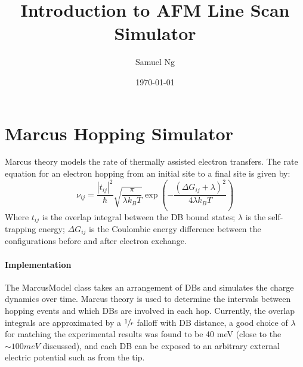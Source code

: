 \documentclass{article}
\title{Introduction to AFM Line Scan Simulator}
\date{\today}
\author{Samuel Ng}
\begin{document}
\makeatletter
\begin{center}
  \Large
  \textbf{\@title}
  \par
  \@author
\end{center}
\makeatother


\section{Marcus Hopping Simulator} \label{sec:introduction}




Marcus theory models the rate of thermally assisted electron transfers. The rate equation for an electron hopping from an initial site to a final site is given by:
%
\begin{equation}
  \nu_{ij} = \frac{|t_{ij}|^{2}}{\hbar} \sqrt{\frac{\pi}{\lambda k_{B} T}} \exp \left(- \frac{(\Delta G_{ij} + \lambda)^{2}}{4 \lambda k_{B} T} \right)
  \label{eq:marcus-tunneling-rate}
\end{equation}
%
Where $t_{ij}$ is the overlap integral between the DB bound states; $\lambda$ is the self-trapping energy; $\Delta G_{ij}$ is the Coulombic energy difference between the configurations before and after electron exchange.




\paragraph{Implementation}

The MarcusModel class takes an arrangement of DBs and simulates the charge dynamics over time. Marcus theory is used to determine the intervals between hopping events and which DBs are involved in each hop. Currently, the overlap integrals are approximated by a $\sfrac{1}{r}$ falloff with DB distance, a good choice of $\lambda$ for matching the experimental results was found to be 40 meV (close to the $\sim 100 meV$ discussed), and each DB can be exposed to an arbitrary external electric potential such as from the tip. 
\end{document}
